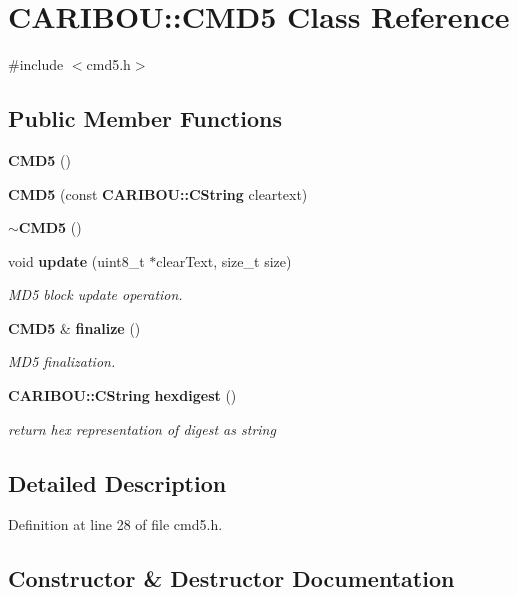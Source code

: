 \section{C\+A\+R\+I\+B\+OU\+:\+:C\+M\+D5 Class Reference}
\label{class_c_a_r_i_b_o_u_1_1_c_m_d5}


{\ttfamily \#include $<$cmd5.\+h$>$}

\subsection*{Public Member Functions}
\begin{DoxyCompactItemize}
\item 
{\bf C\+M\+D5} ()
\item 
{\bf C\+M\+D5} (const {\bf C\+A\+R\+I\+B\+O\+U\+::\+C\+String} cleartext)
\item 
{\bf $\sim$\+C\+M\+D5} ()
\item 
void {\bf update} (uint8\+\_\+t $\ast$clear\+Text, size\+\_\+t size)
\begin{DoxyCompactList}\small\item\em M\+D5 block update operation. \end{DoxyCompactList}\item 
{\bf C\+M\+D5} \& {\bf finalize} ()
\begin{DoxyCompactList}\small\item\em M\+D5 finalization. \end{DoxyCompactList}\item 
{\bf C\+A\+R\+I\+B\+O\+U\+::\+C\+String} {\bf hexdigest} ()
\begin{DoxyCompactList}\small\item\em return hex representation of digest as string \end{DoxyCompactList}\end{DoxyCompactItemize}


\subsection{Detailed Description}


Definition at line 28 of file cmd5.\+h.



\subsection{Constructor \& Destructor Documentation}
